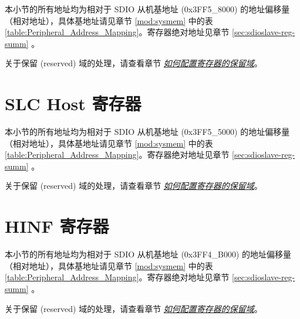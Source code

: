 \documentclass[main\_\_CN.tex]{subfiles}
\begin{document}
本小节的所有地址均为相对于 SDIO 从机基地址 (0x3FF5\_8000) 的地址偏移量（相对地址），具体基地址请见章节 \ref{mod:sysmem} \textit{} 中的表 \ref{table:Peripheral_Address_Mapping}。寄存器绝对地址见章节 \ref{sec:sdioslave-reg-summ} \textit{}。

关于保留 (reserved) 域的处理，请查看章节 \hyperref[programming-reserved-field]{\textit{如何配置寄存器的保留域}}。



\section{SLC Host 寄存器}

本小节的所有地址均为相对于 SDIO 从机基地址 (0x3FF5\_5000) 的地址偏移量（相对地址），具体基地址请见章节 \ref{mod:sysmem} \textit{} 中的表 \ref{table:Peripheral_Address_Mapping}。寄存器绝对地址见章节 \ref{sec:sdioslave-reg-summ} \textit{}。

关于保留 (reserved) 域的处理，请查看章节 \hyperref[programming-reserved-field]{\textit{如何配置寄存器的保留域}}。




\section{HINF 寄存器}

本小节的所有地址均为相对于 SDIO 从机基地址 (0x3FF4\_B000) 的地址偏移量（相对地址），具体基地址请见章节 \ref{mod:sysmem} \textit{} 中的表 \ref{table:Peripheral_Address_Mapping}。寄存器绝对地址见章节 \ref{sec:sdioslave-reg-summ} \textit{}。

关于保留 (reserved) 域的处理，请查看章节 \hyperref[programming-reserved-field]{\textit{如何配置寄存器的保留域}}。


\end{document}
